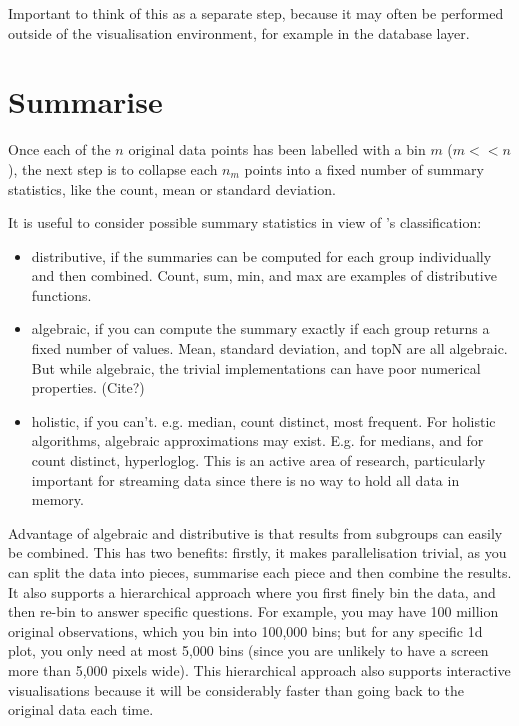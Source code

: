 \documentclass[journal]{vgtc}                %
\begin{document}

Important to think of this as a separate step, because it may often be performed outside of the visualisation environment, for example in the database layer. 

\section{Summarise}
\label{sec:summarise}

Once each of the $n$ original data points has been labelled with a bin $m$ ($m << n$), the next step is to collapse each $n_m$ points into a fixed number of summary statistics, like the count, mean or standard deviation.

It is useful to consider possible summary statistics in view of \citep{gray:1997}'s classification:

\begin{itemize}
  \item distributive, if the summaries can be computed for each group individually and then combined. Count, sum, min, and max are examples of distributive functions.
  
  \item algebraic, if you can compute the summary exactly if each group returns a fixed number of values. Mean, standard deviation, and topN are all algebraic. But while algebraic, the trivial implementations can have poor numerical properties. (Cite?)
  
  \item holistic, if you can't. e.g. median, count distinct, most frequent. For holistic algorithms, algebraic approximations may exist. E.g. for medians, and for count distinct, hyperloglog.  This is an active area of research, particularly important for streaming data since there is no way to hold all data in memory.

\end{itemize}

Advantage of algebraic and distributive is that results from subgroups can easily be combined. This has two benefits: firstly, it makes parallelisation trivial, as you can split the data into pieces, summarise each piece and then combine the results. It also supports a hierarchical approach where you first finely bin the data, and then re-bin to answer specific questions. For example, you may have 100 million original observations, which you bin into 100,000 bins; but for any specific 1d plot, you only need at most 5,000 bins (since you are unlikely to have a screen more than 5,000 pixels wide). This hierarchical approach also supports interactive visualisations because it will be considerably faster than going back to the original data each time.
\end{document}
